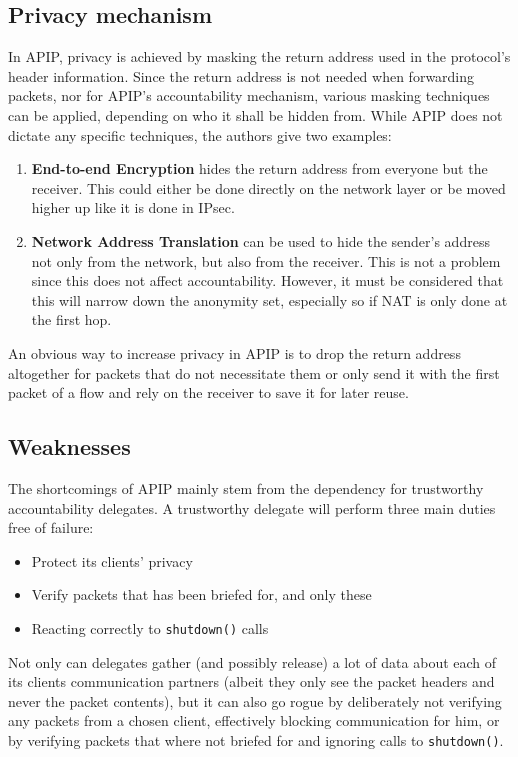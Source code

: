 \documentclass{acm_proc_article-sp}
\begin{document}
\subsection{Privacy mechanism}
In APIP, privacy is achieved by masking the return address used in the protocol's header information. Since the return address is not needed when forwarding packets, nor for APIP's accountability mechanism, various masking techniques can be applied, depending on who it shall be hidden from. While APIP does not dictate any specific techniques, the authors give two examples:
\begin{enumerate}
\item \textbf{End-to-end Encryption} hides the return address from everyone but the receiver. This could either be done directly on the network layer or be moved higher up like it is done in IPsec. 
\item \textbf{Network Address Translation} can be used to hide the sender's address not only from the network, but also from the receiver. This is not a problem since this does not affect accountability. However, it must be considered that this will narrow down the anonymity set, especially so if NAT is only done at the first hop.
\end{enumerate}
An obvious way to increase privacy in APIP is to drop the return address altogether for packets that do not necessitate them or only send it with the first packet of a flow and rely on the receiver to save it for later reuse.

\subsection{Weaknesses}
The shortcomings of APIP mainly stem from the dependency for trustworthy accountability delegates. A trustworthy delegate will perform three main duties free of failure:
\begin{itemize}
\item Protect its clients' privacy
\item Verify packets that has been briefed for, and only these
\item Reacting correctly to \texttt{shutdown()} calls 
\end{itemize}
Not only can delegates gather (and possibly release) a lot of data about each of its clients communication partners (albeit they only see the packet headers and never the packet contents), but it can also go rogue by deliberately not verifying any packets from a chosen client, effectively blocking communication for him, or by verifying packets that where not briefed for and ignoring calls to \texttt{shutdown()}.
\end{document}
